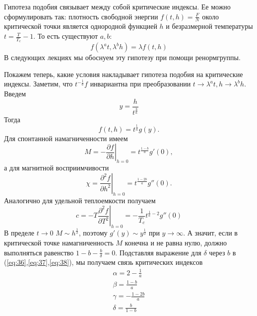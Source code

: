 \documentclass[a4paper,12pt]{article} \usepackage[utf8x]{inputenc} \usepackage[russian]{babel}
\theoremstyle{definition} \newtheorem{corollary}{Corollary}[theorem] \theoremstyle{definition}
\begin{document}
Гипотеза подобия связывает между собой критические индексы. Ее можно сформулировать так: плотность
свободной энергии $f(t,h)=\frac{F}{N}$ около критической точки является однородной функцией $h$ и
безразмерной температуры $t=\frac{T}{T_c}-1$. То есть существуют $a,b$:
\begin{equation}
  \label{eq:33} f(\lambda^a t,\lambda^b h)=\lambda f(t,h)
\end{equation} В следующих лекциях мы обоснуем эту гипотезу при помощи ренормгруппы.

Покажем теперь, какие условия накладывает гипотеза подобия на критические индексы. Заметим, что
$t^{-\frac{1}{a}}f$ инвариантна при преобразовании $t\to \lambda^a t, h\to \lambda^b h$. Введем
\begin{equation}
  \label{eq:34} y=\frac{h}{t^{\frac{b}{a}}}
\end{equation} Тогда
\begin{equation}
  \label{eq:35} f(t,h)=t^{\frac{1}{a}}g(y).
\end{equation} Для спонтанной намагниченности имеем
\begin{equation}
  \label{eq:36} M=-\left.\frac{\partial f}{\partial h}\right|_{h=0}=t^{\frac{1-b}{a}}g'(0),
\end{equation} а для магнитной восприимчивости
\begin{equation}
  \label{eq:37} \chi=\left.\frac{\partial^2 f}{\partial h^2}\right|_{h=0}=t^{\frac{1-2b}{a}}g''(0).
\end{equation} Аналогично для удельной теплоемкости получаем
\begin{equation}
  \label{eq:38} c=-T\left.\frac{\partial^2 f}{\partial
T^2}\right|_{h=0}=-\frac{1}{T_c}t^{\frac{1}{a}-2}g''(0)
\end{equation} В пределе $t\to 0$ $M\sim h^{\frac{1}{\delta}}$, поэтому $g'(y)\sim
y^{\frac{1}{\delta}}$ при $y\to \infty$. А значит, если в критической точке намагниченность $M$
конечна и не равна нулю, должно выполняться равенство $1-b-\frac{b}{\delta}=0$. Подставляя выражение
для $\delta$ через $b$ в (\ref{eq:36},\ref{eq:37},\ref{eq:38}), мы получаем связь критических
индексов
  \begin{eqnarray}
    \label{eq:39} \alpha=2-\frac{1}{a}\\ \beta=\frac{1-b}{a}\\ \gamma=-\frac{1-2b}{a}\\
\delta=\frac{b}{1-b}
  \end{eqnarray}
\end{document}
